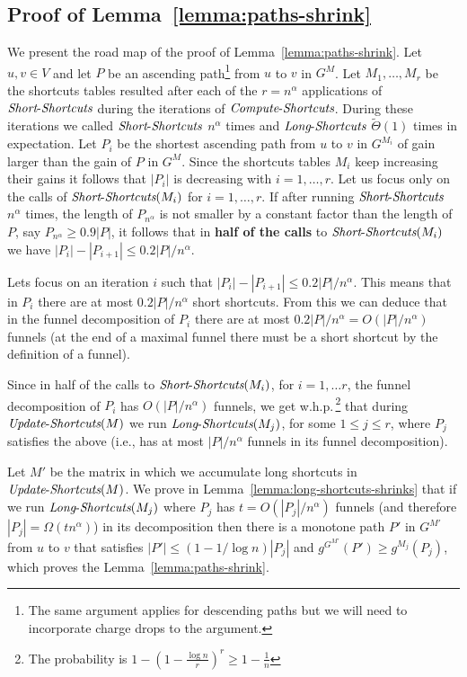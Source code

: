 \documentclass[11pt]{article}
\newcommand{\LS}{\mbox{{\it Long}-{\it Shortcuts}}}
\newcommand{\Simple}{\mbox{{\it Short}-{\it Shortcuts}}}
\newcommand{\ComputeS}{\mbox{{\it Compute}-{\it Shortcuts}}}
\newcommand{\UpdateS}{\mbox{{\it Update}-{\it Shortcuts}}}
\begin{document}
\subsection{Proof of Lemma~\ref{lemma:paths-shrink}}

We present the road map of the proof of Lemma~\ref{lemma:paths-shrink}. Let $u,v\in V$ and let $P$ be an ascending path\footnote{The same argument applies for descending paths but we will need to incorporate charge drops to the argument.} from $u$ to $v$ in $G^M$. Let $M_1,\ldots ,M_r$ be the shortcuts tables resulted after each of the $r = n^\alpha$ applications of $\Simple$ during the iterations of $\ComputeS$. During these iterations we called $\Simple$ $n^{\alpha}$ times and $\LS$ $\tilde{\Theta}(1)$ times in expectation. Let $P_i$ be the shortest ascending path from $u$ to $v$ in $G^{M_i}$ of gain larger than the gain of $P$ in $G^M$. Since the shortcuts tables $M_i$ keep increasing their gains it follows that $|P_i|$ is decreasing with $i=1,\ldots , r$.
Let us focus only on the calls of $\Simple(M_i)$ for $i=1,\ldots,r$. If after running $\Simple$ $n^\alpha$ times, the length of $P_{n^\alpha}$ is not smaller by a constant factor than the length of $P$, say $P_{n^\alpha} \ge 0.9 |P|$, it follows that in \textbf{half of the calls} to $\Simple(M_i)$ we have $|P_i| - |P_{i+1}| \le 0.2 |P|/n^{\alpha}$. 

Lets focus on an iteration $i$ such that 
$|P_i| - |P_{i+1}| \le 0.2 |P|/n^{\alpha}$. This means that in $P_i$ there are at most $ 0.2 |P|/n^{\alpha}$ short shortcuts. From this we can deduce that in the funnel decomposition of $P_i$ there are 
at most $0.2 |P|/n^{\alpha}=O(|P|/n^{\alpha})$ funnels (at the end of a maximal funnel there must be a short shortcut by the definition of a funnel).

Since in half of the calls to $\Simple(M_i)$, for
$i=1,\ldots r$, the funnel decomposition of $P_i$
 has $O(|P|/n^{\alpha})$ funnels, we get w.h.p.\,\footnote{The probability is $1-\left( 1- \frac{\log n}{r} \right)^r \ge 1-\frac{1}{n}$} that during $\UpdateS(M)$ we run $\LS(M_j)$, for some $1\le j \le r$, where $P_j$ satisfies the above (i.e., has at most $|P|/n^\alpha$ funnels in its funnel decomposition).


Let $M'$ be the matrix in which we accumulate long shortcuts in $\UpdateS(M)$. We prove in Lemma~\ref{lemma:long-shortcuts-shrinks} that if we run $\LS(M_j)$ where $P_j$ has $t=O(|P_j|/n^\alpha)$ funnels (and therefore $|P_j| = \Omega(t n^\alpha)$) in its decomposition then there is a monotone path $P'$ in $G^{M'}$ from $u$ to $v$ that satisfies $|P'| \le  \left( 1- 1/\log n \right)|P_j|$ and $g^{G^{M'}}(P') \ge g^{M_j}(P_j)$, which proves the Lemma~\ref{lemma:paths-shrink}.
\end{document}
